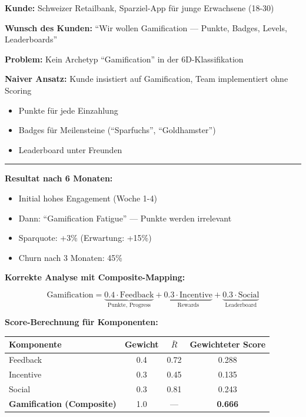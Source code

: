 \begin{tcolorbox}[colback=red!3!white, colframe=red!60!black,
    title=\textbf{Case Study 4: Die Bank und die fehlende ``Gamification''}]

\textbf{Kunde:} Schweizer Retailbank, Sparziel-App für junge Erwachsene (18-30)

\textbf{Wunsch des Kunden:} ``Wir wollen Gamification --- Punkte, Badges, Levels, Leaderboards''

\textbf{Problem:} Kein Archetyp ``Gamification'' in der 6D-Klassifikation

\textbf{Naiver Ansatz:} Kunde insistiert auf Gamification, Team implementiert ohne Scoring
\begin{itemize}[nosep]
    \item Punkte für jede Einzahlung
    \item Badges für Meilensteine (``Sparfuchs'', ``Goldhamster'')
    \item Leaderboard unter Freunden
\end{itemize}

\medskip
\hrule
\medskip

\textbf{Resultat nach 6 Monaten:}
\begin{itemize}[nosep]
    \item Initial hohes Engagement (Woche 1-4)
    \item Dann: ``Gamification Fatigue'' --- Punkte werden irrelevant
    \item Sparquote: +3\% (Erwartung: +15\%)
    \item Churn nach 3 Monaten: 45\%
\end{itemize}

\textbf{Korrekte Analyse mit Composite-Mapping:}

\begin{equation*}
\text{Gamification} = \underbrace{0.4 \cdot \text{Feedback}}_{\text{Punkte, Progress}} + \underbrace{0.3 \cdot \text{Incentive}}_{\text{Rewards}} + \underbrace{0.3 \cdot \text{Social}}_{\text{Leaderboard}}
\end{equation*}

\textbf{Score-Berechnung für Komponenten:}
\begin{center}
\begin{tabular}{@{}lccc@{}}
\toprule
\textbf{Komponente} & \textbf{Gewicht} & $\bar{R}$ & \textbf{Gewichteter Score} \\
\midrule
Feedback & 0.4 & 0.72 & 0.288 \\
Incentive & 0.3 & 0.45 & 0.135 \\
Social & 0.3 & 0.81 & 0.243 \\
\midrule
\textbf{Gamification (Composite)} & 1.0 & --- & \textbf{0.666} \\
\bottomrule
\end{tabular}
\end{center}


\end{tcolorbox}
